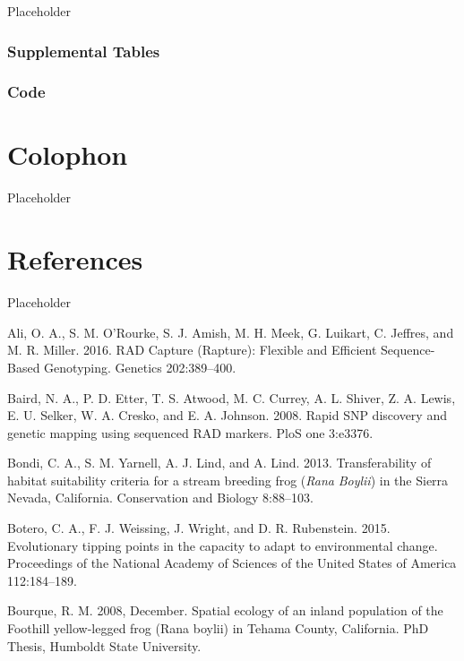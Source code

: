 \documentclass[twoside,12pt,final]{ucthesis-CA2012} %
\begin{document}
\begin{ucmainmatter}
Placeholder

\hypertarget{supptables}{%
\subsection{Supplemental Tables}\label{supptables}}

\hypertarget{code}{%
\subsection{Code}\label{code}}

\hypertarget{colophon}{%
\chapter*{Colophon}\label{colophon}}

Placeholder

\hypertarget{references}{%
\chapter*{References}\label{references}}

Placeholder

\hypertarget{refs}{}
\leavevmode\hypertarget{ref-ali_rad_2016}{}%
Ali, O. A., S. M. O'Rourke, S. J. Amish, M. H. Meek, G. Luikart, C.
Jeffres, and M. R. Miller. 2016. RAD Capture (Rapture): Flexible and
Efficient Sequence-Based Genotyping. Genetics 202:389--400.

\leavevmode\hypertarget{ref-baird_rapid_2008}{}%
Baird, N. A., P. D. Etter, T. S. Atwood, M. C. Currey, A. L. Shiver, Z.
A. Lewis, E. U. Selker, W. A. Cresko, and E. A. Johnson. 2008. Rapid SNP
discovery and genetic mapping using sequenced RAD markers. PloS one
3:e3376.

\leavevmode\hypertarget{ref-bondi_transferability_2013}{}%
Bondi, C. A., S. M. Yarnell, A. J. Lind, and A. Lind. 2013.
Transferability of habitat suitability criteria for a stream breeding
frog (\emph{Rana} \emph{Boylii}) in the Sierra Nevada, California.
Conservation and Biology 8:88--103.

\leavevmode\hypertarget{ref-botero_evolutionary_2015}{}%
Botero, C. A., F. J. Weissing, J. Wright, and D. R. Rubenstein. 2015.
Evolutionary tipping points in the capacity to adapt to environmental
change. Proceedings of the National Academy of Sciences of the United
States of America 112:184--189.

\leavevmode\hypertarget{ref-bourque_spatial_2008}{}%
Bourque, R. M. 2008, December. Spatial ecology of an inland population
of the Foothill yellow-legged frog (Rana boylii) in Tehama County,
California. PhD Thesis, Humboldt State University.


\end{ucmainmatter}
\end{document}
